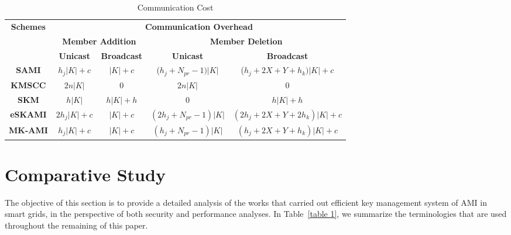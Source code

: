 \begin{table*}
\begin{center}
\centering
\caption{Communication Cost}
\label{table 5}
\begin{tabular}{|c|c|c|c|c|}
\hline
\multirow{3}{*}{\textbf{Schemes}} & \multicolumn{4}{c|}{\textbf{Communication Overhead}}                                          \\ \cline{2-5} 
                                  & \multicolumn{2}{c|}{\textbf{Member Addition}} & \multicolumn{2}{c|}{\textbf{Member Deletion}} \\ \cline{2-5} 
                                  & \textbf{Unicast}     & \textbf{Broadcast}     & \textbf{Unicast}     & \textbf{Broadcast}     \\ \hline
\textbf{SAMI} \cite{Benmalek2015}                     & $h_j|K|+c$                      & $|K|+c$                      & ($h_j+N_{pr}-1)|K|$                    & ($h_j+2X+Y+h_k)|K|+c$                      \\ \hline
\textbf{KMSCC} \cite{Liu13}                     & $2n|K|$                    & $0$                      & $2n|K|$                    & $0$                      \\ \hline
\textbf{SKM} \cite{Wan14}                      & $h|K|$                    & $h|K|+h$                      & $0$                    & $h|K|+h$                      \\ \hline
\textbf{eSKAMI} \cite{Benmalek15}                   & $2h_j|K|+c$                    & $|K|+c$                       & $(2h_j+N_{pr}-1)|K|$                    & $(2h_j+2X+Y+2h_k)|K|+c$                      \\ \hline
\textbf{MK-AMI} \cite{Benmalek2016}                   & $h_j|K|+c$                    & $|K|+c$                      &  $(h_j+N_{pr}-1)|K|$                   & $(h_j+2X+Y+h_k)|K|+c$                      \\ \hline
\end{tabular}
\end{center}
\end{table*} 

\section{Comparative Study} 
The objective of this section is to provide a detailed analysis of the works that carried out efficient key management system of AMI in smart grids, in the perspective of both security and performance analyses. In Table~\ref{table 1}, we summarize the terminologies that are used throughout the remaining of this paper.

